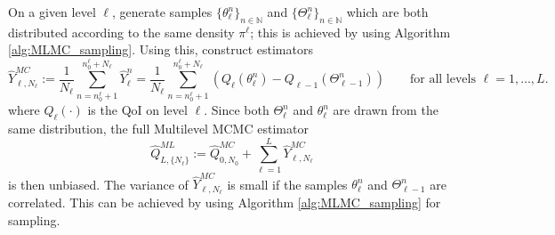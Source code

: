 \documentclass[11pt]{article}
\begin{document}
On a given level $\ell$, generate samples $\{\theta_\ell^n\}_{n\in\mathbb{N}}$ and $\{\Theta_\ell^n\}_{n\in\mathbb{N}}$ which are both distributed according to the same density $\pi^\ell$; this is achieved by using Algorithm \ref{alg:MLMC_sampling}. Using this, construct estimators
\begin{equation}
  \hat{Y}_{\ell,N_\ell}^{MC} := \frac{1}{N_\ell}\sum_{n=n_0^\ell+1}^{n_0^\ell+N_\ell} \hat{Y}_\ell^n = \frac{1}{N_\ell}\sum_{n=n_0^\ell+1}^{n_0^\ell+N_\ell} \left(Q_\ell(\theta_\ell^n) - Q_{\ell-1}(\Theta_{\ell-1}^n)\right)
  \qquad\text{for all levels $\ell=1,\dots,L$}.\label{eqn:difference_estimator}
\end{equation}
where $Q_\ell(\cdot)$ is the QoI on level $\ell$. Since both $\Theta_\ell^n$ and $\theta_\ell^n$ are drawn from the same distribution, the full Multilevel MCMC estimator
\begin{equation}
  \hat{Q}_{L,\{N_\ell\}}^{ML} := \hat{Q}_{0,N_0}^{MC} + \sum_{\ell=1}^L \hat{Y}_{\ell,N_\ell}^{MC}\label{eqn:MLMCMCestimator}
\end{equation}
is then unbiased. The variance of $\hat{Y}_{\ell,N_\ell}^{MC}$ is small if the samples $\theta_\ell^n$ and $\Theta_{\ell-1}^n$ are correlated. This can be achieved by using Algorithm \ref{alg:MLMC_sampling} for sampling.
\end{document}
